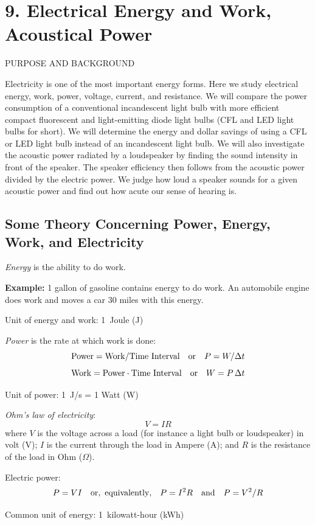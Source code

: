 \documentclass[11pt]{NSF}
\def\be{\begin{equation}}
\def\ee{\end{equation}}
\begin{document}
     
\section{9. Electrical Energy and Work, Acoustical Power}

PURPOSE AND BACKGROUND

Electricity is one of the most important energy forms. 
Here we study electrical energy, work, power, voltage, current,
and resistance. 
We will compare the power consumption of a conventional
incandescent light bulb with more efficient 
compact fluorescent and light-emitting diode light bulbs
(CFL and LED light bulbs for short).
We will determine the energy and dollar savings of using a CFL 
or LED light bulb instead of an incandescent light bulb. 
We will also investigate the acoustic power radiated by
a loudspeaker by finding the sound intensity in front of
the speaker. 
The speaker efficiency then follows from the acoustic power 
divided by the electric power. 
We judge how loud a speaker sounds for a given acoustic power 
and find out how acute our sense of hearing is.

\subsection{Some Theory Concerning Power, Energy, Work, and
Electricity}

{\em Energy} is the ability to do work.

{\bf Example:} 1 gallon of gasoline contains energy to do work. An
automobile engine does work and moves a car 30 miles with this energy.

Unit of energy and work: 1~Joule (J)

{\em Power} is the rate at which work is done:
%
\be
{\rm Power} = {\rm Work/Time~Interval}
\quad{\rm or}\quad
P = W/\Delta t
\ee
%
\be
{\rm Work} = {\rm Power}\cdot{\rm Time~Interval}
\quad{\rm or}\quad
W = P\,\Delta t
\ee

Unit of power: 1~J/s = 1 Watt (W)

{\em Ohm's law of electricity}:
%
\be
V=IR
\ee
%
where
$V$ is the voltage across a load
(for instance a light bulb or loudspeaker) in volt (V); 
$I$ is the current through the load in Ampere (A); and
$R$ is the resistance of the load in Ohm ($\Omega$).

Electric power:
\be
P = VI\quad{\rm or,\ equivalently,}\quad
P = I^2 R\quad{\rm and}\quad 
P = V^2/R
\ee

Common unit of energy: 1~kilowatt-hour (kWh)
\end{document}

